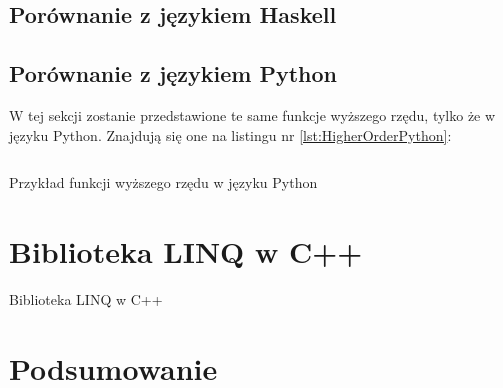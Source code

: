 \documentclass{pracamgr}
\begin{document}
\section{Porównanie z językiem Haskell}
\section{Porównanie z językiem Python}

W tej sekcji zostanie przedstawione te same funkcje wyższego rzędu, tylko że w języku Python. 
Znajdują się one na listingu nr \ref{lst:HigherOrderPython}:
 
\begin{listing}[H]
\inputminted[mathescape, linenos, numbersep=5pt, bgcolor=bg, rulecolor=\color{darkgray}, frame=lines, framesep=2mm]{python}{../SEM1/fun.py}
\caption{Przykład funkcji wyższego rzędu w języku Python}
\label{lst:HigherOrderPython}
\end{listing}









\chapter{Biblioteka LINQ w C++}\label{r:Biblioteka}

Biblioteka LINQ w C++


\chapter{Podsumowanie}



\listoffigures
\listoftables
\end{document}
